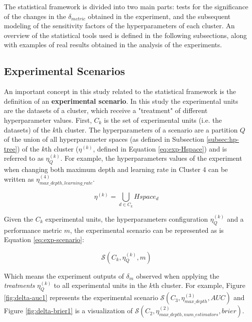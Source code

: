 The statistical framework is divided into two main parts: tests for the significance of the changes in the $\delta_{metric}$ obtained in the experiment, and the subsequent modeling of the sensitivity factors of the hyperparameters of each cluster. An overview of the statistical tools used is defined in the following subsections, along with examples of real results obtained in the analysis of the experiments.

\subsection{Experimental Scenarios}

An important concept in this study related to the statistical framework is the definition of an \textbf{experimental scenario}. In this study the experimental units are the datasets of a cluster, which receive a "treatment" of different hyperparameter values. First, $C_k$ is the set of experimental units (i.e. the datasets) of the $k$th cluster. The hyperparameters of a scenario are a partition $Q$ of the union of all hyperparameter spaces (as defined in Subsection \ref{subsec:hp-tree}) of the $k$th cluster ($\eta^{(k)}$, defined in Equation \ref{eq:exp-Hspace}) and is referred to as  $\eta^{(k)}_Q$. For example, the hyperparameters values of the experiment when changing both maximum depth and learning rate in Cluster 4 can be written as $\eta^{(4)}_{max\_depth, learning\_rate}$.

\begin{equation}
    \eta^{(k)} = \bigcup_{d \in C_k} Hspace_d
    \label{eq:exp-Hspace}
\end{equation}


Given the $C_k$ experimental units, the hyperparameters configuration  $\eta^{(k)}_Q$ and a performance metric $m$, the experimental scenario can be represented as is Equation \ref{eq:exp-scenario}:

\begin{equation}
 \mathcal{S}(C_k, \eta^{(k)}_Q, m)
 \label{eq:exp-scenario}
\end{equation}

Which means the experiment outputs of $\delta_m$ observed when applying the \textit{treatments} $\eta^{(k)}_Q$ to all experimental units in the $k$th cluster. For example,  Figure  \ref{fig:delta-auc1} represents the experimental scenario $\mathcal{S}(C_3, \eta^{(3)}_{max\_depth}, AUC)$ and Figure  \ref{fig:delta-brier1} is a visualization of $\mathcal{S}(C_2, \eta^{(2)}_{max\_depth,num\_estimators}, brier)$.


